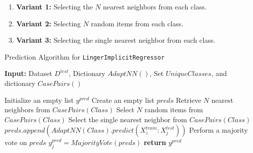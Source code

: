 \documentclass[a4paper, 12pt]{report}
\begin{document}
\begin{enumerate}
\item \textbf{Variant 1:} Selecting the $N$ nearest neighbors from each class.
\item \textbf{Variant 2:} Selecting $N$ random items from each class.
\item \textbf{Variant 3:} Selecting the single nearest neighbor from each class.
\end{enumerate}

\begin{algorithm}[H]
    \caption{Prediction Algorithm for \texttt{LingerImplicitRegressor}}
    \label{alg:LingerImplicitRegressor_predict}
    \textbf{Input:} Dataset $D^{test}$, Dictionary $AdaptNN()$, Set $UniqueClasses$, and dictionary $CasePairs()$
    \begin{algorithmic}
        \State Initialize an empty list $y^{pred}$
            \State Create an empty list $preds$
                    \State Retrieve $N$ nearest neighbors from $CasePairs(Class)$
                    \State Select $N$ random items from $CasePairs(Class)$
                    \State Select the single nearest neighbor from $CasePairs(Class)$
                \EndIf
                        \State $preds.append(AdaptNN(Class).predict(X^{train}_z:X^{test}_j))$
                    \EndFor
                \EndFor
                \State Perform a majority vote on $preds$
                \State $y^{pred}_j = MajorityVote(preds)$
            \EndFor
        \EndFor
        \State \textbf{return} $y^{pred}$
    \end{algorithmic}
\end{algorithm}
\end{document}
